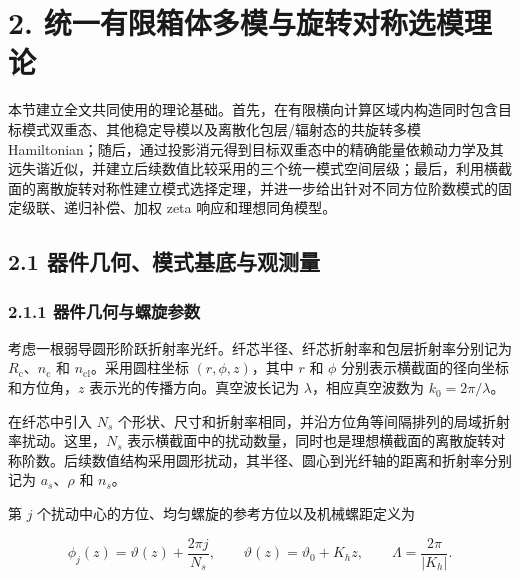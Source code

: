 \documentclass[
  UTF8,
  zihao=-4,
  fontset=fandol]{ctexart}
\author{}
\date{}
\begin{document}
\hypertarget{ux7edfux4e00ux6709ux9650ux7bb1ux4f53ux591aux6a21ux4e0eux65cbux8f6cux5bf9ux79f0ux9009ux6a21ux7406ux8bba}{%
\section{2.
统一有限箱体多模与旋转对称选模理论}\label{ux7edfux4e00ux6709ux9650ux7bb1ux4f53ux591aux6a21ux4e0eux65cbux8f6cux5bf9ux79f0ux9009ux6a21ux7406ux8bba}}

本节建立全文共同使用的理论基础。首先，在有限横向计算区域内构造同时包含目标模式双重态、其他稳定导模以及离散化包层/辐射态的共旋转多模
Hamiltonian；随后，通过投影消元得到目标双重态中的精确能量依赖动力学及其远失谐近似，并建立后续数值比较采用的三个统一模式空间层级；最后，利用横截面的离散旋转对称性建立模式选择定理，并进一步给出针对不同方位阶数模式的固定级联、递归补偿、加权
zeta 响应和理想同角模型。

\hypertarget{ux5668ux4ef6ux51e0ux4f55ux6a21ux5f0fux57faux5e95ux4e0eux89c2ux6d4bux91cf}{%
\subsection{2.1
器件几何、模式基底与观测量}\label{ux5668ux4ef6ux51e0ux4f55ux6a21ux5f0fux57faux5e95ux4e0eux89c2ux6d4bux91cf}}

\hypertarget{ux5668ux4ef6ux51e0ux4f55ux4e0eux87baux65cbux53c2ux6570}{%
\subsubsection{2.1.1
器件几何与螺旋参数}\label{ux5668ux4ef6ux51e0ux4f55ux4e0eux87baux65cbux53c2ux6570}}

考虑一根弱导圆形阶跃折射率光纤。纤芯半径、纤芯折射率和包层折射率分别记为
\(R_{\mathrm c}\)、\(n_{\mathrm c}\) 和
\(n_{\mathrm{cl}}\)。采用圆柱坐标 \((r,\phi,z)\)，其中 \(r\) 和 \(\phi\)
分别表示横截面的径向坐标和方位角，\(z\) 表示光的传播方向。真空波长记为
\(\lambda\)，相应真空波数为 \(k_0=2\pi/\lambda\)。

在纤芯中引入 \(N_s\)
个形状、尺寸和折射率相同，并沿方位角等间隔排列的局域折射率扰动。这里，\(N_s\)
表示横截面中的扰动数量，同时也是理想横截面的离散旋转对称阶数。后续数值结构采用圆形扰动，其半径、圆心到光纤轴的距离和折射率分别记为
\(a_s\)、\(\rho\) 和 \(n_s\)。

第 \(j\) 个扰动中心的方位、均匀螺旋的参考方位以及机械螺距定义为

\[
\phi_j(z)=\vartheta(z)+\frac{2\pi j}{N_s},\qquad
\vartheta(z)=\vartheta_0+K_hz,\qquad
\Lambda=\frac{2\pi}{|K_h|}.
\tag{1}
\]
\end{document}
